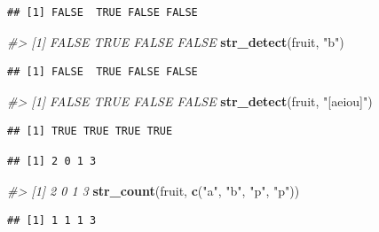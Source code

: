 \documentclass[10pt,]{krantz}
\makeatletter
\newenvironment{Shaded}{\begin{snugshade}}{\end{snugshade}}
\newcommand{\KeywordTok}[1]{\textcolor[rgb]{0.13,0.29,0.53}{\textbf{#1}}}
\newcommand{\StringTok}[1]{\textcolor[rgb]{0.31,0.60,0.02}{#1}}
\newcommand{\CommentTok}[1]{\textcolor[rgb]{0.56,0.35,0.01}{\textit{#1}}}
\newcommand{\NormalTok}[1]{#1}
\newenvironment{kframe}{%
\medskip{}
\setlength{\fboxsep}{.8em}
 \def\at@end@of@kframe{}%
 \ifinner\ifhmode%
  \def\at@end@of@kframe{\end{minipage}}%
  \begin{minipage}{\columnwidth}%
 \fi\fi%
 \def\FrameCommand##1{\hskip\@totalleftmargin \hskip-\fboxsep
 \colorbox{shadecolor}{##1}\hskip-\fboxsep
     \hskip-\linewidth \hskip-\@totalleftmargin \hskip\columnwidth}%
 \MakeFramed {\advance\hsize-\width
   \@totalleftmargin\z@ \linewidth\hsize
   \@setminipage}}%
 {\par\unskip\endMakeFramed%
 \at@end@of@kframe}
\renewenvironment{Shaded}{\begin{kframe}}{\end{kframe}}
\makeatother
\begin{document}
\begin{verbatim}
## [1] FALSE  TRUE FALSE FALSE
\end{verbatim}

\begin{Shaded}
\begin{Highlighting}[]
\CommentTok{#> [1] FALSE  TRUE FALSE FALSE}
\KeywordTok{str_detect}\NormalTok{(fruit, }\StringTok{"b"}\NormalTok{)}
\end{Highlighting}
\end{Shaded}

\begin{verbatim}
## [1] FALSE  TRUE FALSE FALSE
\end{verbatim}

\begin{Shaded}
\begin{Highlighting}[]
\CommentTok{#> [1] FALSE  TRUE FALSE FALSE}
\KeywordTok{str_detect}\NormalTok{(fruit, }\StringTok{"[aeiou]"}\NormalTok{)}
\end{Highlighting}
\end{Shaded}

\begin{verbatim}
## [1] TRUE TRUE TRUE TRUE
\end{verbatim}

\begin{Shaded}
\end{Shaded}

\begin{verbatim}
## [1] 2 0 1 3
\end{verbatim}

\begin{Shaded}
\begin{Highlighting}[]
\CommentTok{#> [1] 2 0 1 3}
\KeywordTok{str_count}\NormalTok{(fruit, }\KeywordTok{c}\NormalTok{(}\StringTok{"a"}\NormalTok{, }\StringTok{"b"}\NormalTok{, }\StringTok{"p"}\NormalTok{, }\StringTok{"p"}\NormalTok{))}
\end{Highlighting}
\end{Shaded}

\begin{verbatim}
## [1] 1 1 1 3
\end{verbatim}
\end{document}
